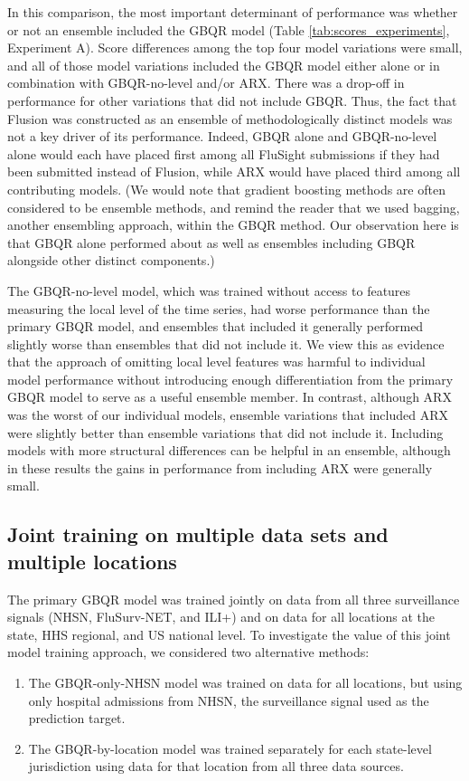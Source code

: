 \documentclass{article}\usepackage[]{graphicx}\usepackage[]{xcolor}
\begin{document}
In this comparison, the most important determinant of performance was whether or not an ensemble included the GBQR model (Table \ref{tab:scores_experiments}, Experiment A). Score differences among the top four model variations were small, and all of those model variations included the GBQR model either alone or in combination with GBQR-no-level and/or ARX. There was a drop-off in performance for other variations that did not include GBQR. Thus, the fact that Flusion was constructed as an ensemble of methodologically distinct models was not a key driver of its performance. Indeed, GBQR alone and GBQR-no-level alone would each have placed first among all FluSight submissions if they had been submitted instead of Flusion, while ARX would have placed third among all contributing models. (We would note that gradient boosting methods are often considered to be ensemble methods, and remind the reader that we used bagging, another ensembling approach, within the GBQR method. Our observation here is that GBQR alone performed about as well as ensembles including GBQR alongside other distinct components.)

The GBQR-no-level model, which was trained without access to features measuring the local level of the time series, had worse performance than the primary GBQR model, and ensembles that included it generally performed slightly worse than ensembles that did not include it. We view this as evidence that the approach of omitting local level features was harmful to individual model performance without introducing enough differentiation from the primary GBQR model to serve as a useful ensemble member. In contrast, although ARX was the worst of our individual models, ensemble variations that included ARX were slightly better than ensemble variations that did not include it. Including models with more structural differences can be helpful in an ensemble, although in these results the gains in performance from including ARX were generally small.

\subsection{Joint training on multiple data sets and multiple locations}

The primary GBQR model was trained jointly on data from all three surveillance signals (NHSN, FluSurv-NET, and ILI+) and on data for all locations at the state, HHS regional, and US national level. To investigate the value of this joint model training approach, we considered two alternative methods:
\begin{enumerate}
\item The GBQR-only-NHSN model was trained on data for all locations, but using only hospital admissions from NHSN, the surveillance signal used as the prediction target.
\item The GBQR-by-location model was trained separately for each state-level jurisdiction using data for that location from all three data sources.
\end{enumerate}
\end{document}
